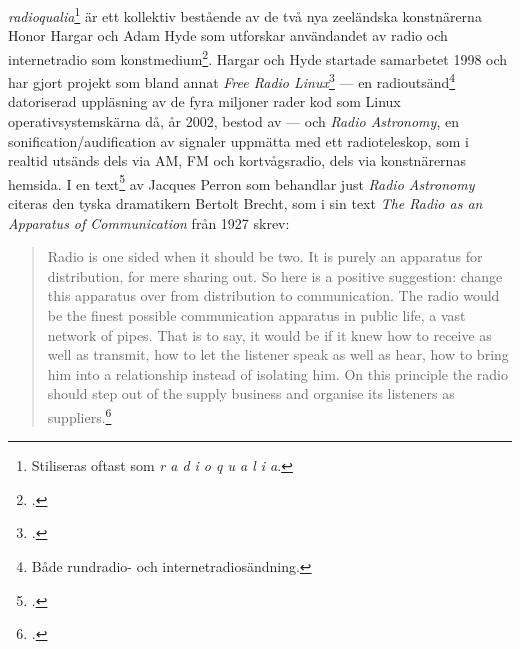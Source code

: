 \documentclass[11pt, a4paper]{article} %
\begin{document}
\emph{radioqualia}\footnote{Stiliseras oftast som \emph{r a d i o q u a l i a}.} är ett kollektiv bestående av de två nya zeeländska konstnärerna Honor Hargar och Adam Hyde som utforskar användandet av radio och internetradio som konstmedium\footcite{noauthor_r_nodate}. Hargar och Hyde startade samarbetet 1998 och har gjort projekt som bland annat \emph{Free Radio Linux}\footcite{noauthor_free_2002} --- en radioutsänd\footnote{Både rundradio- och internetradiosändning.} datoriserad uppläsning av de fyra miljoner rader kod som Linux operativsystemskärna då, år 2002, bestod av --- och \emph{Radio Astronomy}, en \gls{sonification}/\gls{audification} av signaler uppmätta med ett radioteleskop, som i realtid utsänds dels via AM, FM och kortvågsradio, dels via konstnärernas hemsida. I en text\footcite{perron_radioqualia_2003} av Jacques Perron som behandlar just \emph{Radio Astronomy} citeras den tyska dramatikern Bertolt Brecht, som i sin text \emph{The Radio as an Apparatus of Communication} från 1927 skrev:
\begin{quote}
  Radio is one sided when it should be two. It is purely an apparatus for distribution, for mere sharing out. So here is a positive suggestion: change this apparatus over from distribution to communication. The radio would be the finest possible communication apparatus in public life, a vast network of pipes. That is to say, it would be if it knew how to receive as well as transmit, how to let the listener speak as well as hear, how to bring him into a relationship instead of isolating him. On this principle the radio should step out of the supply business and organise its listeners as suppliers.\footcite{brecht_radio_nodate}
\end{quote}
\end{document}
